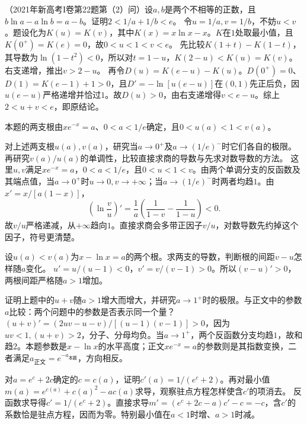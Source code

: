 （2021年新高考I卷第22题第（2）问）设\(a,b\)是两个不相等的正数，且\(b\ln a-a\ln b=a-b\)。证明\(2<1/a+1/b<e\)。
\solutionanswer
令\(u=1/a,v=1/b\)，不妨\(u<v\)。题设化为\(K(u)=K(v)\)，其中\(K(x)=x\ln x-x\)。\(K\)在\(1\)处取最小值，且\(K(0^+)=K(e)=0\)，故\(0<u<1<v<e\)。
先比较\(K(1+t)-K(1-t)\)，其导数为\(\ln(1-t^2)<0\)，所以对\(t=1-u\)，\(K(2-u)<K(u)=K(v)\)。右支递增，推出\(v>2-u\)。
再令\(D(u)=K(e-u)-K(u)\)。\(D(0^+)=0\)、\(D(1)=K(e-1)+1>0\)，且\(D'=-\ln[u(e-u)]\)在\((0,1)\)先正后负，因\(u(e-u)\)严格递增并恰过\(1\)。故\(D(u)>0\)，由右支递增得\(v<e-u\)。综上\(2<u+v<e\)，即原结论。


本题的两支根由\(xe^{-x}=a\)、\(0<a<1/e\)确定，且\(0<u(a)<1<v(a)\)。

对上述两支根\(u(a),v(a)\)，研究当\(a\to0^+\)及\(a\to(1/e)^-\)时它们各自的极限。再研究\(v(a)/u(a)\)的单调性，比较直接求商的导数与先求对数导数的方法。
\solutionanswer
这里\(u,v\)满足\(xe^{-x}=a\)，\(0<a<1/e\)，且\(0<u<1<v\)。由两个单调分支的反函数及其端点值，当\(a\to0^+\)时\(u\to0,v\to+\infty\)；当\(a\to(1/e)^-\)时两者均趋\(1\)。由\(x'=x/[a(1-x)]\)，
\[
 \left(\ln\frac vu\right)'=\frac1a\left(\frac1{1-v}-\frac1{1-u}\right)<0.
\]
故\(v/u\)严格递减，从\(+\infty\)趋向\(1\)。直接求商会多带正因子\(v/u\)，对数导数先约掉这个因子，符号更清楚。


设\(u(a)<v(a)\)为\(x-\ln x=a\)的两个根。求两支的导数，判断根的间距\(v-u\)怎样随\(a\)变化。
\solutionanswer
\(u'=u/(u-1)<0\)，\(v'=v/(v-1)>0\)。所以\((v-u)'>0\)，两根间距严格随\(a>1\)增加。


证明上题中的\(u+v\)随\(a>1\)增大而增大，并研究\(a\to1^+\)时的极限。与正文中的参数\(a\)比较：两个问题中的参数是否表示同一个量？
\solutionanswer
\((u+v)'=(2uv-u-v)/[(u-1)(v-1)]>0\)，因为\(uv<1,(u+v)>2\)，分子、分母均负。当\(a\to1^+\)，两个反函数分支均趋\(1\)，故和趋\(2\)。本题参数是\(x-\ln x\)的水平高度；正文\(xe^{-x}=a\)的参数则是其指数变换，二者满足\(a_{\text{正文}}=e^{-a_{\text{本题}}}\)，方向相反。


对\(a=e^c+2c\)确定的\(c=c(a)\)，证明\(c'(a)=1/(e^c+2)\)。再对最小值\(m(a)=e^{c(a)}+c(a)^2-ac(a)\)求导，观察驻点方程怎样使含\(c'\)的项消去。
\solutionanswer
反函数求导得\(c'=1/(e^c+2)\)。直接求导\(m'=(e^c+2c-a)c'-c=-c\)，含\(c'\)的系数恰是驻点方程，因而为零。特别最小值在\(a<1\)时增、\(a>1\)时减。


